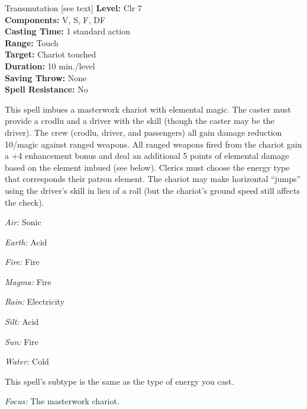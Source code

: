 {Transmutation [see text]}
{
	\textbf{Level:}
	Clr 7\\
	\textbf{Components:}
	V, S, F, DF\\
	\textbf{Casting Time:}
	1 standard action\\
	\textbf{Range:}
	Touch\\
	\textbf{Target:}
	Chariot touched\\
	\textbf{Duration:}
	10 min./level\\
	\textbf{Saving Throw:}
	None\\
	\textbf{Spell Resistance:}
	No\\
}
{
	This spell imbues a masterwork chariot with elemental magic. The caster must provide a crodlu and a driver with the  skill (though the caster may be the driver). The crew (crodlu, driver, and passengers) all gain damage reduction 10/magic against ranged weapons. All ranged weapons fired from the chariot gain a +4 enhancement bonus and deal an additional 5 points of elemental damage based on the element imbued (see below). Clerics must choose the energy type that corresponds their patron element. The chariot may make horizontal ``jumps'' using the driver's  skill in lieu of a  roll (but the chariot's ground speed still affects the check).
	\begin{itemize*}
	\item \textit{Air:} Sonic
	\item \textit{Earth:} Acid
	\item \textit{Fire:} Fire
	\item \textit{Magma:} Fire
	\item \textit{Rain:} Electricity
	\item \textit{Silt:} Acid
	\item \textit{Sun:} Fire
	\item \textit{Water:} Cold
	\end{itemize*}

	This spell's subtype is the same as the type of energy you cast.

	\textit{Focus:} The masterwork chariot.
}
